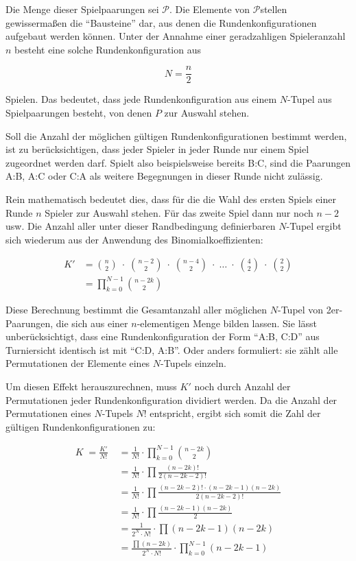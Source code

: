 \documentclass[DIV=15, 10pt]{scrartcl}
\newcommand{\PSet}{$\mathcal{P}$}
\begin{document}
Die Menge dieser Spielpaarungen sei \PSet. Die Elemente von \PSet stellen gewissermaßen die "`Bausteine"' dar, aus denen die Rundenkonfigurationen aufgebaut werden können. Unter der Annahme einer geradzahligen Spieleranzahl $n$ besteht eine solche Rundenkonfiguration aus

\begin{equation}
N = \frac{n}{2}
\end{equation}

Spielen. Das bedeutet, dass jede Rundenkonfiguration aus einem $N$-Tupel  aus Spielpaarungen besteht, von denen $P$ zur Auswahl stehen.

Soll die Anzahl der möglichen gültigen Rundenkonfigurationen bestimmt werden, ist zu berücksichtigen, dass jeder Spieler in jeder Runde nur einem Spiel zugeordnet werden darf. Spielt also beispielsweise bereits B:C, sind die Paarungen A:B, A:C oder C:A als weitere Begegnungen in dieser Runde nicht zulässig.

Rein mathematisch bedeutet dies, dass für die die Wahl des ersten Spiels einer Runde $n$ Spieler zur Auswahl stehen. Für das zweite Spiel dann nur noch $n-2$ usw. Die Anzahl aller unter dieser Randbedingung definierbaren $N$-Tupel ergibt sich wiederum aus der Anwendung des Binomialkoeffizienten:

\begin{align}\label{eqnSizeOfKDash}
K' &= {{n}\choose{2}} \; \cdot \; {{n-2}\choose{2}} \; \cdot \;{{n-4}\choose{2}} \; \cdot \; \ldots
\; \cdot \; {{4}\choose{2}} \; \cdot \; {{2}\choose{2}}\nonumber \\[3mm]
&= \prod_{k = 0}^{N - 1}{{n - 2k}\choose{2}}
\end{align}

Diese Berechnung bestimmt die Gesamtanzahl aller möglichen $N$-Tupel von 2er-Paarungen, die sich aus einer $n$-elementigen Menge bilden lassen. Sie lässt unberücksichtigt, dass eine Rundenkonfiguration der Form "`A:B, C:D"' aus Turniersicht identisch ist mit "`C:D, A:B"'. Oder anders formuliert: sie zählt alle Permutationen der Elemente eines $N$-Tupels einzeln.

Um diesen Effekt herauszurechnen, muss $K'$ noch durch Anzahl der Permutationen jeder Rundenkonfiguration dividiert werden. Da die Anzahl der Permutationen eines $N$-Tupels $N!$ entspricht, ergibt sich somit die Zahl der gültigen Rundenkonfigurationen zu:

\begin{align}\label{eqnComplicated}
K \; = \frac{K'}{N!} \; &= \frac{1}{N!} \cdot \prod_{k=0}^{N-1}{{n-2k}\choose{2}} \nonumber\\[3mm]
&= \frac{1}{N!} \cdot \prod\frac{(n-2k)!}{2(n - 2k -2)!} \nonumber\\[3mm]
&= \frac{1}{N!} \cdot \prod\frac{(n-2k-2)! \cdot (n-2k-1)(n-2k)}{2(n-2k-2)!} \nonumber\\[3mm]
&= \frac{1}{N!} \cdot \prod\frac{(n-2k-1)(n-2k)}{2} \nonumber\\[3mm]
&= \frac{1}{2^N \cdot N!} \cdot \prod(n - 2k -1)(n - 2k) \nonumber\\[3mm]
&= \frac{\prod(n-2k)}{2^N \cdot N!} \cdot \prod_{k=0}^{N-1}(n - 2k -1)
\end{align}
\end{document}
